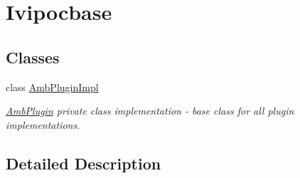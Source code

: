 \hypertarget{group__ivipocbase}{\section{Ivipocbase}
\label{group__ivipocbase}
}
\subsection*{Classes}
\begin{DoxyCompactItemize}
\item 
class \hyperlink{classAmbPluginImpl}{Amb\+Plugin\+Impl}
\begin{DoxyCompactList}\small\item\em \hyperlink{classAmbPlugin}{Amb\+Plugin} private class implementation -\/ base class for all plugin implementations. \end{DoxyCompactList}\end{DoxyCompactItemize}


\subsection{Detailed Description}

